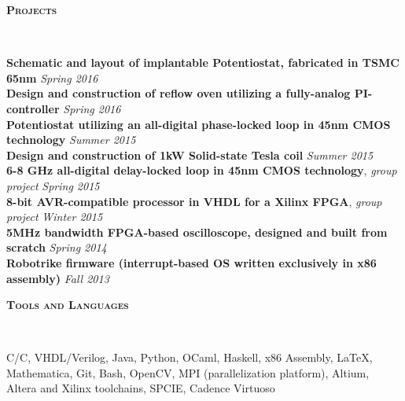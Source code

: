 \documentclass{article}
\newenvironment{changemargin}[2]{%
  \begin{list}{}{%
    \setlength{\topsep}{0pt}%
    \setlength{\leftmargin}{#1}%
    \setlength{\rightmargin}{#2}%
    \setlength{\listparindent}{\parindent}%
    \setlength{\itemindent}{\parindent}%
    \setlength{\parsep}{\parskip}%
  }%
  \item[]}{\end{list}
}
\newcommand{\lineover}{
	\begin{changemargin}{-0.05in}{-0.05in}
		\vspace*{-8pt}
		\hrulefill \\
		\vspace*{-2pt}
	\end{changemargin}
}
\newcommand{\header}[1]{
	\begin{changemargin}{-.5in}{-0.5in}
		{\large \textbf{\scshape{#1}}}\\
  	\lineover
	\end{changemargin}
}
\newenvironment{body} {
	\vspace*{-16pt}
	\begin{changemargin}{-0.25in}{-0.5in}
  }	
	{\end{changemargin}
}
\newcommand{\CC}{C\nolinebreak\hspace{-.05em}\raisebox{.4ex}{\tiny\bf +}\nolinebreak\hspace{-.10em}\raisebox{.4ex}{\tiny\bf +}}
\begin{document}
\smallskip

\header{Projects}
\begin{body}
	\vspace{14pt}
	\textbf{Schematic and layout of implantable Potentiostat, fabricated in TSMC 65nm} \hfill \emph{Spring 2016}\\
	\textbf{Design and construction of reflow oven utilizing a fully-analog PI-controller} \hfill \emph{Spring 2016}\\
	\textbf{Potentiostat utilizing an all-digital phase-locked loop in 45nm CMOS technology} \hfill \emph{Summer 2015}\\
	\textbf{Design and construction of 1kW Solid-state Tesla coil} \hfill \emph{Summer 2015} \\
	\textbf{6-8 GHz all-digital delay-locked loop in 45nm CMOS technology}, \emph{group project} \hfill \emph{Spring 2015}\\
	\textbf{8-bit AVR-compatible processor in VHDL for a Xilinx FPGA}, \emph{group project} \hfill \emph{Winter 2015}\\
	\textbf{5MHz bandwidth FPGA-based oscilloscope, designed and built from scratch} \hfill \emph{Spring 2014}\\
	\textbf{Robotrike firmware (interrupt-based OS written exclusively in x86 assembly)} \hfill \emph{Fall 2013}\\
\end{body}

\medskip

\header{Tools and Languages}

\begin{body}
	\vspace{14pt}
	C/\CC, VHDL/Verilog, Java, Python, OCaml, Haskell, x86 Assembly, \LaTeX, Mathematica, Git, Bash, OpenCV, MPI (parallelization platform), Altium, Altera and Xilinx toolchains, SPCIE, Cadence Virtuoso
\end{body}
\end{document}
